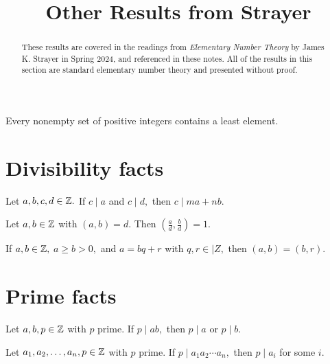 \documentclass[letterpaper, 11 pt]{ximera}
\title{Other Results from Strayer}
\begin{document}
\begin{abstract}
    These results are covered in the readings from \emph{Elementary Number Theory} by James K. Strayer in Spring 2024, and referenced in these notes. All of the results in this section are standard elementary number theory and presented without proof. 
\end{abstract}

\maketitle

\begin{axiom}\label{well-order}
    Every nonempty set of positive integers contains a least element.
\end{axiom}

\section{Divisibility facts}\label{sec:additional-div}

    \begin{lem*}[Proposition 1.2]\label{lem:linear-combo}
         Let $a,b,c,d\in\mathbb Z.$ If $c\mid a$ and $c\mid d,$ then $c\mid ma+nb.$
    \end{lem*}


    \begin{prop*}[Proposition 1.10]\label{prop:div-gcd-rel-prime}
        Let $a,b\in\mathbb Z$ with $(a,b)=d.$ Then $(\tfrac{a}{d},\tfrac{b}{d})=1.$
    \end{prop*}


    \begin{lem*}[Lemma 1.12]\label{lem:gcd-remainders}
     If $a,b\in\mathbb Z,$ $a\geq b\gt 0,$ and $a=bq+r$ with $q,r\in|Z,$ then $(a,b)=(b,r).$
    \end{lem*}
    

\section{Prime facts}\label{sec:additional-primes}

\begin{lem*}[Lemma 1.14]\label{lem:irreducible-prime}
    Let $a,b,p\in\mathbb Z$ with $p$ prime. If $p\mid ab,$ then $p\mid a$ or $p\mid b.$
\end{lem*}

\begin{cor*}[Corollary 1.15]\label{cor:irreducible-prime} Let $a_1,a_2,\dots,a_n,p\in\mathbb Z$ with $p$ prime. If $p\mid a_1a_2\cdots a_n,$ then $p\mid a_i$ for some $i.$
\end{cor*}
\end{document}
